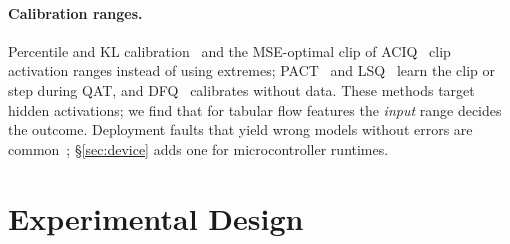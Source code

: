 \documentclass[sigplan,10pt,review,anonymous,nonacm]{acmart}
\begin{document}
\paragraph{Calibration ranges.} Percentile and KL calibration~\cite{wu2020integer} and the MSE-optimal
clip of ACIQ~\cite{banner2019aciq} clip activation ranges instead of using extremes;
PACT~\cite{choi2018pact} and LSQ~\cite{esser2020lsq} learn the clip or step during QAT, and
DFQ~\cite{nagel2019dfq} calibrates without data. These methods target hidden activations; we find
that for tabular flow features the \emph{input} range decides the outcome. Deployment faults that
yield wrong models without errors are common~\cite{chen2021deployment,jajal2024onnx}; \S\ref{sec:device}
adds one for microcontroller runtimes.

\section{Experimental Design}\label{sec:design}
\end{document}
